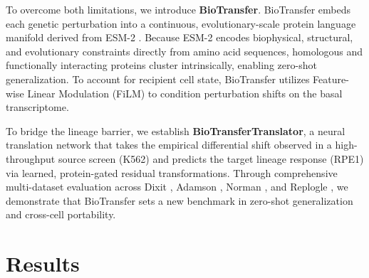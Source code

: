 \documentclass[11pt,letterpaper]{article}
\begin{document}
To overcome both limitations, we introduce \textbf{BioTransfer}. BioTransfer embeds each genetic perturbation into a continuous, evolutionary-scale protein language manifold derived from ESM-2 \cite{lin2023evolutionary}. Because ESM-2 encodes biophysical, structural, and evolutionary constraints directly from amino acid sequences, homologous and functionally interacting proteins cluster intrinsically, enabling zero-shot generalization. To account for recipient cell state, BioTransfer utilizes Feature-wise Linear Modulation (FiLM) \cite{perez2018film} to condition perturbation shifts on the basal transcriptome. 

To bridge the lineage barrier, we establish \textbf{BioTransferTranslator}, a neural translation network that takes the empirical differential shift observed in a high-throughput source screen (K562) and predicts the target lineage response (RPE1) via learned, protein-gated residual transformations. Through comprehensive multi-dataset evaluation across Dixit \cite{dixit2016perturb}, Adamson \cite{adamson2016multiplexed}, Norman \cite{norman2019exploring}, and Replogle \cite{replogle2022mapping}, we demonstrate that BioTransfer sets a new benchmark in zero-shot generalization and cross-cell portability.

\section{Results}
\end{document}

